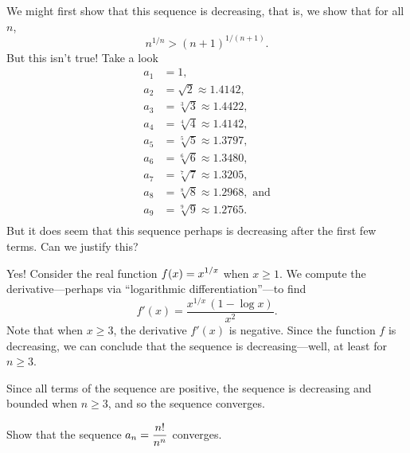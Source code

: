 \begin{solution}
  We might first show that this sequence is decreasing, that is, we show
  that for all $n$,
  $$
  n^{1/n} > (n+1)^{1/(n+1)}.
  $$
  But this isn't true!  Take a look
  \begin{align*}
    a_1 &= 1, \\
    a_2 &= \sqrt{2} \approx 1.4142, \\
    a_3 &= \sqrt[3]{3} \approx 1.4422, \\
    a_4 &= \sqrt[4]{4} \approx 1.4142, \\
    a_5 &= \sqrt[5]{5} \approx 1.3797, \\
    a_6 &= \sqrt[6]{6} \approx 1.3480, \\
    a_7 &= \sqrt[7]{7} \approx 1.3205, \\
    a_8 &= \sqrt[8]{8} \approx 1.2968, \mbox{ and}\\
    a_9 &= \sqrt[9]{9} \approx 1.2765. \\
  \end{align*}
  But it does seem that this sequence perhaps is decreasing after the
  first few terms.  Can we justify this?

  Yes!  Consider the real function $\displaystyle f(x)=x^{1/x}$ when $x\ge1$.
  We compute the derivative---perhaps via ``logarithmic differentiation''---to find
  $$
  f'(x)=\frac{x^{1/x} \, (1-\log x)}{x^2}.
  $$
  Note that when $x\ge 3$, the derivative $f'(x)$ is negative.  Since the function $f$ is decreasing, we can conclude that the sequence is decreasing---well, at least for $n \geq 3$.

  Since all terms of the sequence are positive, the sequence is
  decreasing and bounded when $n \ge 3$, and so the sequence converges.
\end{solution}


\begin{example}
Show that the sequence $a_n = \displaystyle\frac{n!}{n^n}$ converges.
\end{example}

